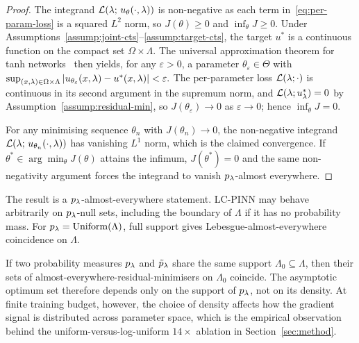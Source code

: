 \documentclass[12pt,a4paper]{extarticle}
\begin{document}
\begin{proof}
The integrand $\mathcal{L}(\lambda;\, u_\theta(\cdot, \lambda))$ is non-negative as each term in~\eqref{eq:per-param-loss} is a squared $L^2$ norm, so $J(\theta) \ge 0$ and $\inf_\theta J \ge 0$. Under Assumptions~\ref{assump:joint-cts}--\ref{assump:target-cts}, the target $u^*$ is a continuous function on the compact set $\Omega \times \Lambda$. The universal approximation theorem for tanh networks~\cite{hornik1989multilayer} then yields, for any $\varepsilon > 0$, a parameter $\theta_\varepsilon \in \Theta$ with
\(
    \sup_{(x, \lambda) \in \Omega \times \Lambda} |u_{\theta_\varepsilon}(x, \lambda) - u^*(x, \lambda)| < \varepsilon.
\)
The per-parameter loss $\mathcal{L}(\lambda; \cdot)$ is continuous in its second argument in the supremum norm, and $\mathcal{L}(\lambda; u_\lambda^*) = 0$ by Assumption~\ref{assump:residual-min}, so $J(\theta_\varepsilon) \to 0$ as $\varepsilon \to 0$; hence $\inf_\theta J = 0$.

For any minimising sequence $\theta_n$ with $J(\theta_n) \to 0$, the non-negative integrand $\mathcal{L}(\lambda;\, u_{\theta_n}(\cdot, \lambda))$ has vanishing $L^1$ norm, which is the claimed convergence. If $\theta^* \in \arg\min_\theta J(\theta)$ attains the infimum, $J(\theta^*) = 0$ and the same non-negativity argument forces the integrand to vanish $p_\lambda$-almost everywhere.
\end{proof}

\begin{remark}
The result is a $p_\lambda$-almost-everywhere statement. LC-PINN may behave arbitrarily on $p_\lambda$-null sets, including the boundary of $\Lambda$ if it has no probability mass. For $p_\lambda = \mathrm{Uniform}(\Lambda)$, full support gives Lebesgue-almost-everywhere coincidence on $\Lambda$.
\end{remark}

\begin{remark}
If two probability measures $p_\lambda$ and $\tilde p_\lambda$ share the same support $\Lambda_0 \subseteq \Lambda$, then their sets of almost-everywhere-residual-minimisers on $\Lambda_0$ coincide. The asymptotic optimum set therefore depends only on the support of $p_\lambda$, not on its density. At finite training budget, however, the choice of density affects how the gradient signal is distributed across parameter space, which is the empirical observation behind the uniform-versus-log-uniform $14\times$ ablation in Section~\ref{sec:method}.
\end{remark}
\end{document}
